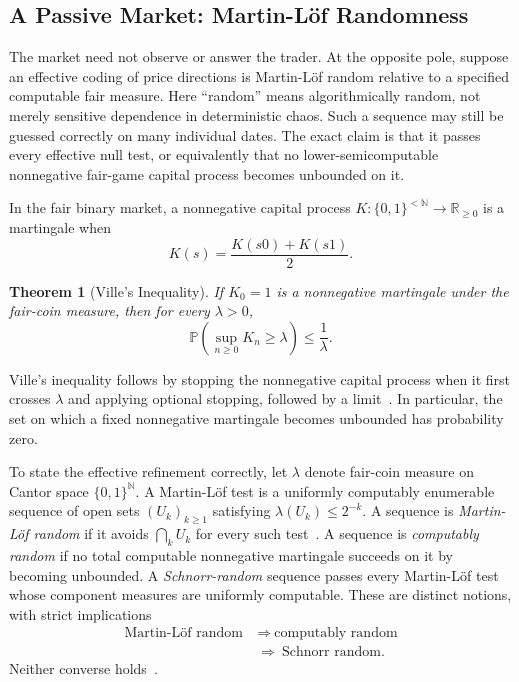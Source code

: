 \documentclass[aps,pra,reprint,superscriptaddress,amsmath,amssymb,floatfix]{revtex4-2}
\theoremstyle{plain}
\newtheorem{theorem}{Theorem}
\theoremstyle{definition}
\theoremstyle{remark}
\begin{document}
\subsection{A Passive Market: Martin-L\"of Randomness}

The market need not observe or answer the trader. At the opposite pole,
suppose an effective coding of price directions is Martin-L\"of random
relative to a specified computable fair measure. Here ``random'' means
algorithmically random, not merely sensitive dependence in deterministic
chaos. Such a sequence may still be guessed correctly on many individual
dates. The exact claim is that it passes every effective null test, or
equivalently that no lower-semicomputable nonnegative fair-game capital process
becomes unbounded on it.

In the fair binary market, a nonnegative capital process
\(K\colon\{0,1\}^{<\mathbb{N}}\to\mathbb{R}_{\geq0}\) is a martingale when
\begin{equation}
  K(s)=\frac{K(s0)+K(s1)}2.
  \label{eq:computablemartingale}
\end{equation}

\begin{theorem}[Ville's Inequality]
  \label{thm:ville}
  If \(K_0=1\) is a nonnegative martingale under the fair-coin measure, then
  for every \(\lambda>0\),
  \begin{equation}
    \mathbb{P}\!\left(\sup_{n\geq0}K_n\geq\lambda\right)
    \leq\frac1\lambda.
    \label{eq:ville}
  \end{equation}
\end{theorem}

Ville's inequality follows by stopping the nonnegative capital process when it
first crosses \(\lambda\) and applying optional stopping, followed by a
limit~\cite{Ville1939}. In particular, the set on which a fixed nonnegative
martingale becomes unbounded has probability zero.

To state the effective refinement correctly, let \(\lambda\) denote fair-coin
measure on Cantor space \(\{0,1\}^{\mathbb N}\). A Martin-L\"of test is a
uniformly computably enumerable sequence of open sets
\((U_k)_{k\geq1}\) satisfying \(\lambda(U_k)\leq2^{-k}\). A sequence is
\emph{Martin-L\"of random} if it avoids \(\bigcap_k U_k\) for every such
test~\cite{MartinLof1966}. A sequence is \emph{computably random} if no total
computable nonnegative martingale succeeds on it by becoming unbounded. A
\emph{Schnorr-random} sequence passes every Martin-L\"of test whose component
measures are uniformly computable. These are distinct notions, with strict
implications
\begin{equation}
  \begin{aligned}
    \text{Martin-L\"of random}
      &\ \Longrightarrow\ \text{computably random}\\
      &\ \Longrightarrow\ \text{Schnorr random}.
  \end{aligned}
  \label{eq:randomhierarchy}
\end{equation}
Neither converse holds~\cite{schnorr1,Nies2009,DH}.
\end{document}
